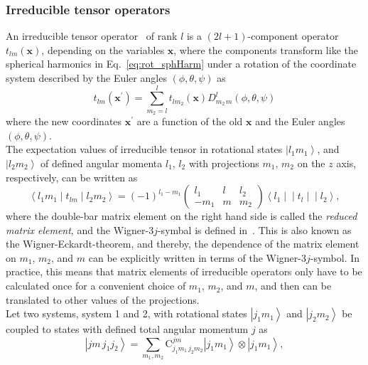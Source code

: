 \subsubsection*{Irreducible tensor operators}
An irreducible tensor operator~\cite{varshalovich1988} of rank $l$ is a $(2l+1)$-component operator $t_{lm}(\mathbf{x})$, depending on the variables $\mathbf{x}$, where the components transform like the spherical harmonics in Eq.~\eqref{eq:rot_sphHarm} under a rotation of the coordinate system described by the Euler angles $(\phi,\theta,\psi)$ as
\begin{equation}
t_{lm}(\mathbf{x}^\prime) = \sum_{m_2=l}^l t_{lm_2}(\mathbf{x}) D^l_{m_2\,m}(\phi,\theta,\psi)
\end{equation}
where the new coordinates $\mathbf{x}^\prime$ are a function of the old $\mathbf{x}$ and the Euler angles $(\phi,\theta,\psi)$.\\ 
The expectation values of irreducible tensor in rotational states $\left|l_1m_1\right>$, and $\left|l_2m_2\right>$ of defined angular momenta $l_1,\,l_2$ with projections $m_1,\,m_2$ on the $z$ axis, respectively, can be written as~\cite{varshalovich1988}
\begin{equation}
\label{app:wignerEckardt}
\left< l_1 m_1 \middle| t_{lm} \middle| l_2 m_2\right>=
(-1)^{l_1-m_1}
\begin{pmatrix}
l_1 & l & l_2\\
-m_1 & m & m_2
\end{pmatrix}
\left<l_1 \middle|\middle| t_{l} \middle|\middle| l_2\right>,
\end{equation}
where the double-bar matrix element on the right hand side is called the \textit{reduced matrix element}, and the Wigner-$3j$-symbal is defined in~\cite[Section 8.]{varshalovich1988}. This is also known as the Wigner-Eckardt-theorem, and thereby, the dependence of the matrix element on $m_1$, $m_2$, and $m$ can be explicitly written in terms of the Wigner-$3j$-symbol. In practice, this means that matrix elements of irreducible operators only have to be calculated once for a convenient  choice of $m_1$, $m_2$, and $m$, and then can be translated to other values of the projections.\\[9pt]
Let two systems, system 1 and 2, with rotational states $\left|j_1m_1\right>$ and $\left| j_2m_2\right>$ be  coupled to states with defined total angular momentum $j$ as
\begin{equation}
\label{eq:coupledState}
\left|jm\,j_1j_2\right> = \sum_{m_1,m_2}\text{C}^{jm}_{j_1m_1\,j_2m_2}
\left|j_1m_1\right>\otimes\left| j_1m_1\right>,
\end{equation}
